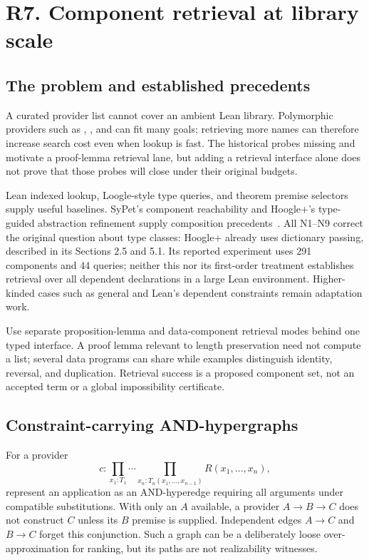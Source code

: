 \section{R7. Component retrieval at library scale}\label{sec:retrieval}

\subsection{The problem and established precedents}\label{sec:retrieval-boundary}

A curated provider list cannot cover an ambient Lean library. Polymorphic providers such as , , and  can fit many goals; retrieving more names can therefore increase search cost even when lookup is fast. The historical probes missing  and  motivate a proof-lemma retrieval lane, but adding a retrieval interface alone does not prove that those probes will close under their original budgets.

Lean indexed lookup, Loogle-style type queries, and theorem premise selectors supply useful baselines. SyPet's component reachability and Hoogle+'s type-guided abstraction refinement supply composition precedents~\cite{sypet,hoogleplus}. All N1--N9 correct the original question about type classes: Hoogle+ already uses dictionary passing, described in its Sections 2.5 and 5.1. Its reported experiment uses 291 components and 44 queries; neither this nor its first-order treatment establishes retrieval over all dependent declarations in a large Lean environment. Higher-kinded cases such as general  and Lean's dependent constraints remain adaptation work.

Use separate proposition-lemma and data-component retrieval modes behind one typed interface. A proof lemma relevant to length preservation need not compute a list; several data programs can share  while examples distinguish identity, reversal, and duplication. Retrieval success is a proposed component set, not an accepted term or a global impossibility certificate.

\subsection{Constraint-carrying AND-hypergraphs}\label{sec:retrieval-hypergraph}

For a provider
\[
 c:\prod_{x_1:T_1}\cdots\prod_{x_n:T_n(x_1,\ldots,x_{n-1})}
 R(x_1,\ldots,x_n),
\]
represent an application as an AND-hyperedge requiring all arguments under compatible substitutions. With only an $A$ available, a provider $A\to B\to C$ does not construct $C$ unless its $B$ premise is supplied. Independent edges $A\to C$ and $B\to C$ forget this conjunction. Such a graph can be a deliberately loose over-approximation for ranking, but its paths are not realizability witnesses.

